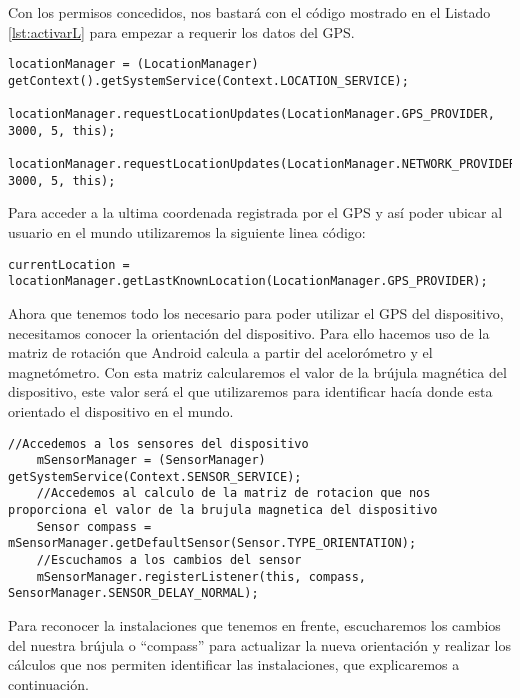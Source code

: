 Con los permisos concedidos, nos bastará con el código mostrado en el Listado \ref{lst:activarL} para empezar a requerir los datos del GPS.

\begin{lstlisting}[caption={Código para activar el GPS del dispositivo.}, label={lst:activarL}]
    locationManager = (LocationManager) getContext().getSystemService(Context.LOCATION_SERVICE);
    locationManager.requestLocationUpdates(LocationManager.GPS_PROVIDER, 3000, 5, this);
    locationManager.requestLocationUpdates(LocationManager.NETWORK_PROVIDER, 3000, 5, this);
\end{lstlisting}

Para acceder a la ultima coordenada registrada por el GPS y así poder ubicar al usuario en el mundo utilizaremos la siguiente linea código:

\begin{lstlisting}[caption={Código para acceder a la última ubicación registrada del GPS.}, label={lst:ubicacionL}]
    currentLocation = locationManager.getLastKnownLocation(LocationManager.GPS_PROVIDER);
\end{lstlisting}


Ahora que tenemos todo los necesario para poder utilizar el GPS del dispositivo, necesitamos conocer la orientación del dispositivo. Para ello hacemos uso de la matriz de rotación que Android calcula a partir del acelorómetro y el magnetómetro. Con esta matriz calcularemos el valor de la brújula magnética del dispositivo, este valor será el que utilizaremos para identificar hacía donde esta orientado el dispositivo en el mundo.


\begin{lstlisting}[caption={Código para acceder a la última ubicación registrada del GPS.}, label={lst:ubicacionL}]
    //Accedemos a los sensores del dispositivo
    mSensorManager = (SensorManager) getSystemService(Context.SENSOR_SERVICE); 
    //Accedemos al calculo de la matriz de rotacion que nos proporciona el valor de la brujula magnetica del dispositivo
    Sensor compass = mSensorManager.getDefaultSensor(Sensor.TYPE_ORIENTATION);
    //Escuchamos a los cambios del sensor
    mSensorManager.registerListener(this, compass, SensorManager.SENSOR_DELAY_NORMAL);    
\end{lstlisting}


Para reconocer la instalaciones que tenemos en frente, escucharemos los cambios del nuestra brújula o ``compass'' para actualizar la nueva orientación y realizar los cálculos que nos permiten identificar las instalaciones, que explicaremos a continuación.


